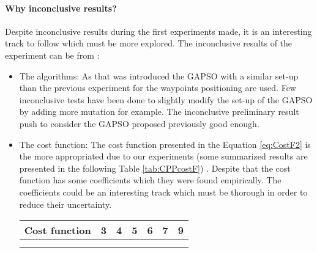 	\paragraph*{Why inconclusive results?} \label{sec:inconclusiveResults}
			  
		
		Despite inconclusive results during the first experiments made, it is an interesting track to follow  which must  be more explored.  
		The inconclusive results of the experiment can be from : %
		\begin{itemize}
		\item The algorithms: As that was introduced the GAPSO  with a similar set-up than the previous experiment for the waypoints positioning %
		 are used. Few inconclusive tests have been done to slightly modify the set-up of the GAPSO by adding more mutation for example. The inconclusive preliminary result push to consider the GAPSO proposed previously good enough.
		\item The cost function: The cost function presented in the Equation \ref{eq:CostF2} is the more appropriated due to our experiments (some summarized results are presented in the following Table \ref{tab:CPPcostF}) . Despite that the cost function has some coefficients which they were found empirically. The coefficients could be an interesting track which must be thorough in order to reduce their uncertainty. 
		\begin{tabular}{l|p{1.3cm}p{1.3cm}p{1.3cm}p{1.3cm}p{1.3cm}p{1.3cm}}\label{tab:CPPcostF}
\textbf {Cost function} &\textbf {3}  &\textbf{4  }       & \textbf{5  } &\textbf{6  }&\textbf{7  }&\textbf{9  }\\ \hline
\cellcolor[HTML]{F2F2FF}{$\sum_{i=1}^{n}Pc_i + \frac{400\times\sum_{i=1}^{n}Pc_i}{(\frac{Distance}{N})\times 2.} /400$}  &  \cellcolor[HTML]{F2F2FF}{56.23\%  458px}       & \cellcolor[HTML]{F2F2FF}{ 60.54\%  652px} & \cellcolor[HTML]{F2F2FF}{65.15\%   817px}& \cellcolor[HTML]{F2F2FF}{ 65.85\%  1114px}& \cellcolor[HTML]{F2F2FF}{ 69.41\%  1077px}& \cellcolor[HTML]{F2F2FF}{ 90.67\%  1396px}\\ \hline
\cellcolor[HTML]{FFFFFF}{$\sum_{i=1}^{n}Pc_i + \frac{\sum_{i=1}^{n}Pc_i}{(\frac{Distance}{N})\times 5.}$}  &  \cellcolor[HTML]{FFFFFF}{56.15\%  444px}       & \cellcolor[HTML]{FFFFFF}{ 59.34\%  645px} & \cellcolor[HTML]{FFFFFF}{64.93\%  859px}& \cellcolor[HTML]{FFFFFF}{ 70.14\%  1051px}& \cellcolor[HTML]{FFFFFF}{ 76.59\%  1001px}& \cellcolor[HTML]{FFFFFF}{ 86.77\%  1381px}\\ \hline

\end{tabular}
\end{itemize}
